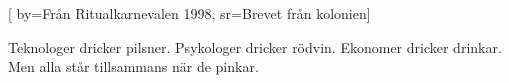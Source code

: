 


[ 	%
	by={Från Ritualkarnevalen 1998},	%
	sr={Brevet från kolonien}]	%
	
\beginverse*		%
Teknologer dricker pilsner. 
Psykologer dricker rödvin. 
Ekonomer dricker drinkar. 
Men alla står tillsammans när de pinkar.
\endverse			%
\endsong			%
